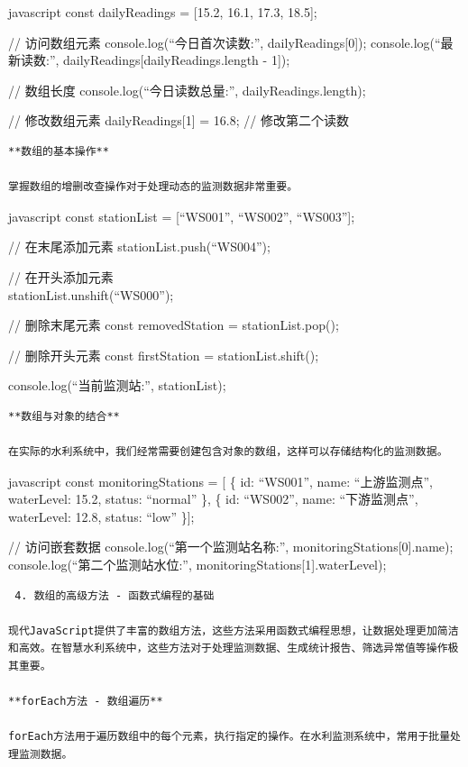 {javascript const dailyReadings = {[}15.2, 16.1, 17.3, 18.5{]};

// 访问数组元素 console.log(``今日首次读数:'', dailyReadings{[}0{]}); console.log(``最新读数:'', dailyReadings{[}dailyReadings.length - 1{]});

// 数组长度 console.log(``今日读数总量:'', dailyReadings.length);

// 修改数组元素 dailyReadings{[}1{]} = 16.8; // 修改第二个读数

\begin{lstlisting}
**数组的基本操作**

掌握数组的增删改查操作对于处理动态的监测数据非常重要。
\end{lstlisting}

javascript const stationList = {[}``WS001'', ``WS002'', ``WS003''{]};

// 在末尾添加元素 stationList.push(``WS004'');

// 在开头添加元素\\
stationList.unshift(``WS000'');

// 删除末尾元素 const removedStation = stationList.pop();

// 删除开头元素 const firstStation = stationList.shift();

console.log(``当前监测站:'', stationList);

\begin{lstlisting}
**数组与对象的结合**

在实际的水利系统中，我们经常需要创建包含对象的数组，这样可以存储结构化的监测数据。
\end{lstlisting}

javascript const monitoringStations = {[} \{ id: ``WS001'', name: ``上游监测点'', waterLevel: 15.2, status: ``normal'' \}, \{ id: ``WS002'', name: ``下游监测点'', waterLevel: 12.8, status: ``low'' \}{]};

// 访问嵌套数据 console.log(``第一个监测站名称:'', monitoringStations{[}0{]}.name); console.log(``第二个监测站水位:'', monitoringStations{[}1{]}.waterLevel);

\begin{lstlisting}
 4. 数组的高级方法 - 函数式编程的基础

现代JavaScript提供了丰富的数组方法，这些方法采用函数式编程思想，让数据处理更加简洁和高效。在智慧水利系统中，这些方法对于处理监测数据、生成统计报告、筛选异常值等操作极其重要。

**forEach方法 - 数组遍历**

forEach方法用于遍历数组中的每个元素，执行指定的操作。在水利监测系统中，常用于批量处理监测数据。
\end{lstlisting}

}
